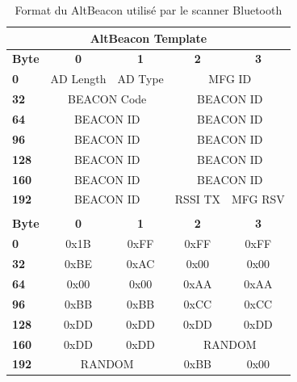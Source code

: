 \begin{table}[ht!]
\centering
\caption{Format du AltBeacon utilisé par le scanner Bluetooth}
\label{tab-AltBeaconSmartCantonFormat}
\begin{tabular}{|l|c|c|c|c|}
\hline
\multicolumn{5}{|c|}{\cellcolor[HTML]{BBDAFF}\textbf{AltBeacon Template}} \\ \hline
\textbf{Byte} & \textbf{0} & \textbf{1} & \textbf{2} & \textbf{3} \\ \hline
\textbf{0} & AD Length & AD Type & \multicolumn{2}{c|}{MFG ID} \\ \hline
\textbf{32} & \multicolumn{2}{c|}{BEACON Code} & \multicolumn{2}{c|}{BEACON ID} \\ \hline
\textbf{64} & \multicolumn{2}{c|}{BEACON ID} & \multicolumn{2}{c|}{BEACON ID} \\ \hline
\textbf{96} & \multicolumn{2}{c|}{BEACON ID} & \multicolumn{2}{c|}{BEACON ID} \\ \hline
\textbf{128} & \multicolumn{2}{c|}{BEACON ID} & \multicolumn{2}{c|}{BEACON ID} \\ \hline
\textbf{160} & \multicolumn{2}{c|}{BEACON ID} & \multicolumn{2}{c|}{BEACON ID} \\ \hline
\textbf{192} & \multicolumn{2}{c|}{BEACON ID} & RSSI TX & MFG RSV \\ \hhline{=====}
\multicolumn{5}{|c|}{\cellcolor[HTML]{BBDAFF}\textbf{AltBeacon SmartCanton}} \\ \hline
\textbf{Byte} & \textbf{0} & \textbf{1} & \textbf{2} & \textbf{3} \\ \hline
\textbf{0} & 0x1B & 0xFF & 0xFF & 0xFF \\ \hline
\textbf{32} & 0xBE & 0xAC & 0x00 & 0x00 \\ \hline
\textbf{64} & 0x00 & 0x00 & 0xAA & 0xAA \\ \hline
\textbf{96} & 0xBB & 0xBB & 0xCC & 0xCC \\ \hline
\textbf{128} & 0xDD & 0xDD & 0xDD & 0xDD \\ \hline
\textbf{160} & 0xDD & 0xDD & \multicolumn{2}{c|}{RANDOM} \\ \hline
\textbf{192} & \multicolumn{2}{c|}{RANDOM} & 0xBB & 0x00 \\ \hline
\end{tabular}
\end{table}


\FloatBarrier






